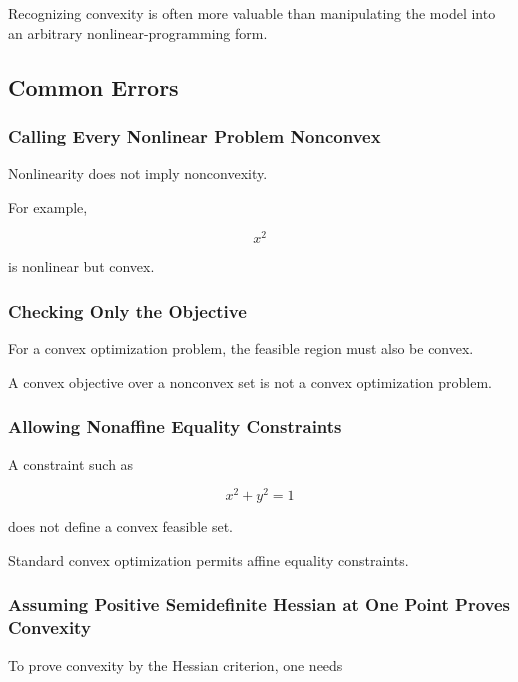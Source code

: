 Recognizing convexity is often more valuable than manipulating the model
into an arbitrary nonlinear-programming form.

\subsection{Common Errors}
\label{subsec:convex-optimization-common-errors}

\subsubsection{Calling Every Nonlinear Problem Nonconvex}

Nonlinearity does not imply nonconvexity.

For example,

\[
x^2
\]

is nonlinear but convex.

\subsubsection{Checking Only the Objective}

For a convex optimization problem, the feasible region must also be
convex.

A convex objective over a nonconvex set is not a convex optimization
problem.

\subsubsection{Allowing Nonaffine Equality Constraints}

A constraint such as

\[
x^2+y^2=1
\]

does not define a convex feasible set.

Standard convex optimization permits affine equality constraints.

\subsubsection{Assuming Positive Semidefinite Hessian at One Point Proves Convexity}

To prove convexity by the Hessian criterion, one needs


